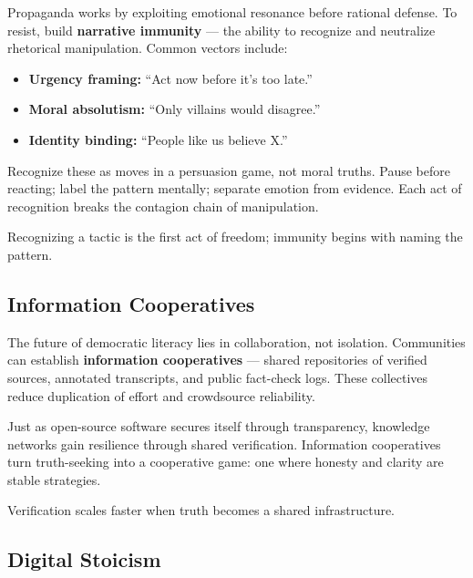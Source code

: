 \documentclass[12pt,twoside]{book}
\begin{document}
Propaganda works by exploiting emotional resonance before rational defense.  
To resist, build \textbf{narrative immunity} --- the ability to recognize and neutralize rhetorical manipulation.  
Common vectors include:
\begin{itemize}
  \item \textbf{Urgency framing:} “Act now before it’s too late.”  
  \item \textbf{Moral absolutism:} “Only villains would disagree.”  
  \item \textbf{Identity binding:} “People like us believe X.”  
\end{itemize}

Recognize these as moves in a persuasion game, not moral truths.  
Pause before reacting; label the pattern mentally; separate emotion from evidence.  
Each act of recognition breaks the contagion chain of manipulation. \\

\begin{keyidea}
Recognizing a tactic is the first act of freedom; immunity begins with naming the pattern.
\end{keyidea}

\subsection*{Information Cooperatives}

The future of democratic literacy lies in collaboration, not isolation.  
Communities can establish \textbf{information cooperatives} --- shared repositories of verified sources, annotated transcripts, and public fact-check logs.  
These collectives reduce duplication of effort and crowdsource reliability.  

Just as open-source software secures itself through transparency, knowledge networks gain resilience through shared verification.  
Information cooperatives turn truth-seeking into a cooperative game: one where honesty and clarity are stable strategies.\\

\begin{keyidea}
Verification scales faster when truth becomes a shared infrastructure.
\end{keyidea}

\subsection*{Digital Stoicism}
\end{document}
